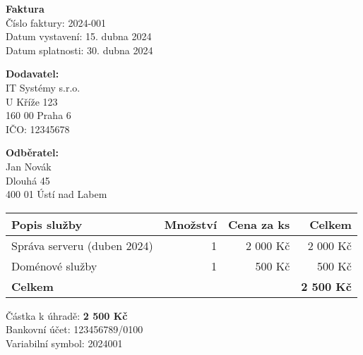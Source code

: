\documentclass[a4paper,12pt]{article}
\begin{document}
\begin{center}
    {\Large \textbf{Faktura}} \\
    \vspace{0.5cm}
    Číslo faktury: 2024-001 \\
    Datum vystavení: 15. dubna 2024 \\
    Datum splatnosti: 30. dubna 2024
\end{center}

\vspace{1cm}

\textbf{Dodavatel:} \\
IT Systémy s.r.o. \\
U Kříže 123 \\
160 00 Praha 6 \\
IČO: 12345678 \\

\vspace{0.5cm}

\textbf{Odběratel:} \\
Jan Novák \\
Dlouhá 45 \\
400 01 Ústí nad Labem \\

\vspace{0.5cm}

\begin{tabular}{|l|r|r|r|}
\hline
Popis služby & Množství & Cena za ks & Celkem \\
\hline
Správa serveru (duben 2024) & 1 & 2 000 Kč & 2 000 Kč \\
Doménové služby & 1 & 500 Kč & 500 Kč \\
\hline
\textbf{Celkem} & & & \textbf{2 500 Kč} \\
\hline
\end{tabular}

\vspace{1cm}

Částka k úhradě: \textbf{2 500 Kč} \\
Bankovní účet: 123456789/0100 \\
Variabilní symbol: 2024001
\end{document}
